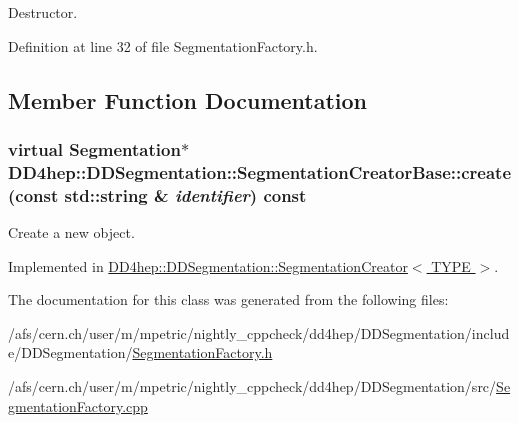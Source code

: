 Destructor. 

Definition at line 32 of file SegmentationFactory.h.

\subsection{Member Function Documentation}
\hypertarget{class_d_d4hep_1_1_d_d_segmentation_1_1_segmentation_creator_base_aad60d04fe90588d97eeb8030f8d6daa3}{
\subsubsection[{create}]{\setlength{\rightskip}{0pt plus 5cm}virtual {\bf Segmentation}$\ast$ DD4hep::DDSegmentation::SegmentationCreatorBase::create (const std::string \& {\em identifier}) const}}
\label{class_d_d4hep_1_1_d_d_segmentation_1_1_segmentation_creator_base_aad60d04fe90588d97eeb8030f8d6daa3}


Create a new object. 

Implemented in \hyperlink{class_d_d4hep_1_1_d_d_segmentation_1_1_segmentation_creator_a2b9ff4869b443f3b04a017174206281b}{DD4hep::DDSegmentation::SegmentationCreator$<$ TYPE $>$}.

The documentation for this class was generated from the following files:\begin{DoxyCompactItemize}
\item 
/afs/cern.ch/user/m/mpetric/nightly\_\-cppcheck/dd4hep/DDSegmentation/include/DDSegmentation/\hyperlink{_segmentation_factory_8h}{SegmentationFactory.h}\item 
/afs/cern.ch/user/m/mpetric/nightly\_\-cppcheck/dd4hep/DDSegmentation/src/\hyperlink{_segmentation_factory_8cpp}{SegmentationFactory.cpp}\end{DoxyCompactItemize}
